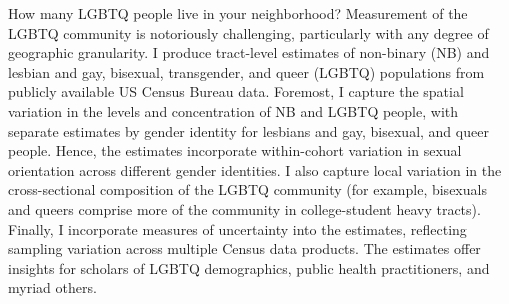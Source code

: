 How many LGBTQ people live in your neighborhood? Measurement of the LGBTQ community is notoriously challenging, particularly with any degree of geographic granularity. I produce tract-level estimates of non-binary (NB) and lesbian and gay, bisexual, transgender, and queer (LGBTQ) populations from publicly available US Census Bureau data. Foremost, I capture the spatial variation in the levels and concentration of NB and LGBTQ people, with separate estimates by gender identity for lesbians and gay, bisexual, and queer people. Hence, the estimates incorporate within-cohort variation in sexual orientation across different gender identities. I also capture local variation in the cross-sectional composition of the LGBTQ community (for example, bisexuals and queers comprise more of the community in college-student heavy tracts). Finally, I incorporate measures of uncertainty into the estimates, reflecting sampling variation across multiple Census data products. The estimates offer insights for scholars of LGBTQ demographics, public health practitioners, and myriad others. 